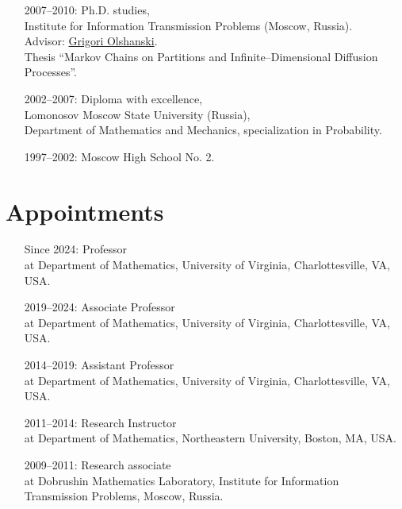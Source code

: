 \documentclass[letterpaper,11pt]{article}
\begin{document}
\begin{itemize}
	\item
	      [2007--2010:]
	      Ph.D. studies,\\Institute for Information Transmission Problems
	      (Moscow, Russia). \\ Advisor:
	      \href{http://www.iitp.ru/en/userpages/88/}{Grigori Olshanski}.\\ Thesis
	      ``Markov Chains on Partitions and Infinite--Dimensional Diffusion Processes''.

	\item
	      [2002--2007:]
	      Diploma with excellence,\\ Lomonosov Moscow State University
	      (Russia),\\ Department of Mathematics and Mechanics, specialization in Probability.

	\item
	      [1997--2002:] Moscow High School No. 2.
\end{itemize}

\section*{Appointments}

\begin{itemize}
	\item
	      [Since 2024:]
	      Professor\\ at Department of Mathematics, University
	      of Virginia, Charlottesville, VA, USA.
	\item
	      [2019--2024:]
	      Associate Professor\\ at Department of Mathematics, University
	      of Virginia, Charlottesville, VA, USA.
	\item
	      [2014--2019:]
	      Assistant Professor\\ at Department of Mathematics, University
	      of Virginia, Charlottesville, VA, USA.
	\item
	      [2011--2014:]
	      Research Instructor\\ at Department of Mathematics, Northeastern
	      University, Boston, MA, USA.
	\item
	      [2009--2011:]
	      Research associate\\ at Dobrushin Mathematics Laboratory,
	      Institute for Information Transmission Problems, Moscow, Russia.
\end{itemize}
\end{document}
